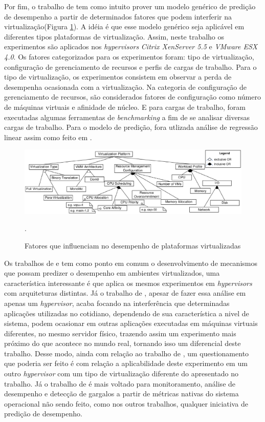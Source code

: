 Por fim, o trabalho de  tem como intuito prover um modelo genérico de predição de desempenho a partir de determinados fatores que podem interferir na virtualização(Figura \ref{influence_factors}). A idéia é que esse modelo genérico seja aplicável em diferentes tipos plataformas de virtualização. Assim, neste trabalho os experimentos são aplicados nos \textit{hypervisors } \textit{Citrix XenServer 5.5} e \textit{VMware ESX 4.0}. Os fatores categorizados para os experimentos foram: tipo de virtualização, configuração de gerenciamento de recursos e perfis de cargas de trabalho. Para o tipo de virtualização, os experimentos consistem em observar a perda de desempenha ocasionada com a virtualização. Na categoria de configuração de gerenciamento de recursos, são considerados fatores de configuração como número de máquinas virtuais e afinidade de núcleo. E para cargas de trabalho, foram executadas algumas ferramentas de \textit{benchmarking} a fim de se analisar diversas cargas de trabalho. Para o modelo de predição, fora utlizada análise de regressão linear assim como feito em .

\begin{figure}[!htb]
\centering
\includegraphics [keepaspectratio=true,scale=0.50]{figuras/factors_influence.eps}
\caption{Fatores que influenciam no desempenho de plataformas virtualizadas}
\cite{huber2011}.
\label{influence_factors}
\end{figure} 

Os trabalhos de  e  tem como ponto em comum o desenvolvimento de mecanismos que possam predizer o desempenho em ambientes virtualizados, uma característica interessante é que  aplica os mesmos experimentos em \textit{hypervisors} com arquiteturas distintas. Já o trabalho de  , apesar de fazer essa análise em apenas um \textit{hypervisor}, acaba focando na interferência que determinadas aplicações utilizadas no cotidiano, dependendo de sua característica a nivel de sistema, podem ocasionar em outras aplicações executadas em máquinas virtuais diferentes, no mesmo servidor físico,  trazendo assim um experimento mais próximo do que acontece no mundo real, tornando isso um diferencial deste trabalho. Desse modo, ainda com relação ao trabalho de , um questionamento que poderia ser feito é com relação a aplicabilidade deste experimento em um outro \textit{hypervisor} com um tipo de virtualização diferente do apresentado no trabalho. Já o trabalho de  é mais voltado para monitoramento, análise de desempenho e detecção de gargalos a partir de métricas nativas do sistema operacional não sendo feito, como nos outros trabalhos, qualquer iniciativa de predição de desempenho.

